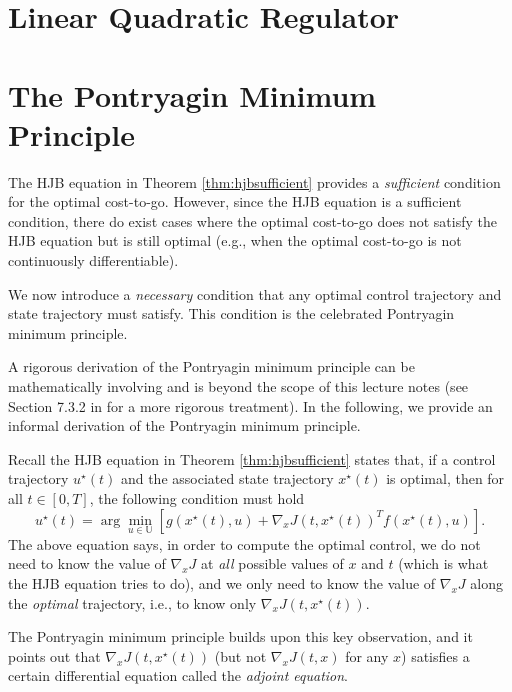\documentclass[
]{book}
\theoremstyle{definition}
\theoremstyle{definition}
\theoremstyle{definition}
\theoremstyle{definition}
\theoremstyle{remark}
\begin{document}
\hypertarget{linear-quadratic-regulator}{%
\section{Linear Quadratic Regulator}\label{linear-quadratic-regulator}}

\hypertarget{the-pontryagin-minimum-principle}{%
\section{The Pontryagin Minimum Principle}\label{the-pontryagin-minimum-principle}}

The HJB equation in Theorem \ref{thm:hjbsufficient} provides a \emph{sufficient} condition for the optimal cost-to-go. However, since the HJB equation is a sufficient condition, there do exist cases where the optimal cost-to-go does not satisfy the HJB equation but is still optimal (e.g., when the optimal cost-to-go is not continuously differentiable).

We now introduce a \emph{necessary} condition that any optimal control trajectory and state trajectory must satisfy. This condition is the celebrated Pontryagin minimum principle.

A rigorous derivation of the Pontryagin minimum principle can be mathematically involving and is beyond the scope of this lecture notes (see Section 7.3.2 in \citep{bertsekas12book-dpocI} for a more rigorous treatment). In the following, we provide an informal derivation of the Pontryagin minimum principle.

Recall the HJB equation in Theorem \ref{thm:hjbsufficient} states that, if a control trajectory \(u^\star(t)\) and the associated state trajectory \(x^\star(t)\) is optimal, then for all \(t \in [0,T]\), the following condition must hold
\begin{equation}
u^\star(t) = \arg\min_{u \in \mathbb{U}} \left[ g(x^\star(t),u) + \nabla_x J(t,x^\star(t))^T f(x^\star(t),u)  \right] 
\label{eq:pmp-intro-from-hjb}.
\end{equation}
The above equation says, in order to compute the optimal control, we do not need to know the value of \(\nabla_x J\) at \emph{all} possible values of \(x\) and \(t\) (which is what the HJB equation tries to do), and we only need to know the value of \(\nabla_x J\) along the \emph{optimal} trajectory, i.e., to know only \(\nabla_x J(t,x^\star(t))\).

The Pontryagin minimum principle builds upon this key observation, and it points out that \(\nabla_x J(t,x^\star(t))\) (but not \(\nabla_x J(t,x)\) for any \(x\)) satisfies a certain differential equation called the \emph{adjoint equation}.
\end{document}
